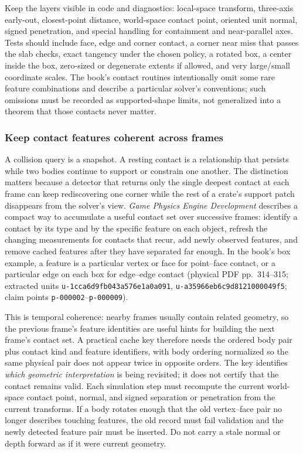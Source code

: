 Keep the layers visible in code and diagnostics: local-space transform, three-axis early-out, closest-point distance, world-space contact point, oriented unit normal, signed penetration, and special handling for containment and near-parallel axes. Tests should include face, edge and corner contact, a corner near miss that passes the slab checks, exact tangency under the chosen policy, a rotated box, a center inside the box, zero-sized or degenerate extents if allowed, and very large/small coordinate scales. The book's contact routines intentionally omit some rare feature combinations and describe a particular solver's conventions; such omissions must be recorded as supported-shape limits, not generalized into a theorem that those contacts never matter.

\subsubsection{Keep contact features coherent across frames}\label{keep-contact-features-coherent-across-frames}

A collision query is a snapshot. A resting contact is a relationship that persists while two bodies continue to support or constrain one another. The distinction matters because a detector that returns only the single deepest contact at each frame can keep rediscovering one corner while the rest of a crate's support patch disappears from the solver's view. \emph{Game Physics Engine Development} describes a compact way to accumulate a useful contact set over successive frames: identify a contact by its type and by the specific feature on each object, refresh the changing measurements for contacts that recur, add newly observed features, and remove cached features after they have separated far enough. In the book's box example, a feature is a particular vertex or face for point--face contact, or a particular edge on each box for edge--edge contact (physical PDF pp.~314--315; extracted units \texttt{u-1cca6d9fb043a576e1a0a091}, \texttt{u-a35966eb6c9d8121000049f5}; claim points \texttt{p-000002}--\texttt{p-000009}).

This is temporal coherence: nearby frames usually contain related geometry, so the previous frame's feature identities are useful hints for building the next frame's contact set. A practical cache key therefore needs the ordered body pair plus contact kind and feature identifiers, with body ordering normalized so the same physical pair does not appear twice in opposite orders. The key identifies \emph{which geometric interpretation} is being revisited; it does not certify that the contact remains valid. Each simulation step must recompute the current world-space contact point, normal, and signed separation or penetration from the current transforms. If a body rotates enough that the old vertex--face pair no longer describes touching features, the old record must fail validation and the newly detected feature pair must be inserted. Do not carry a stale normal or depth forward as if it were current geometry.

